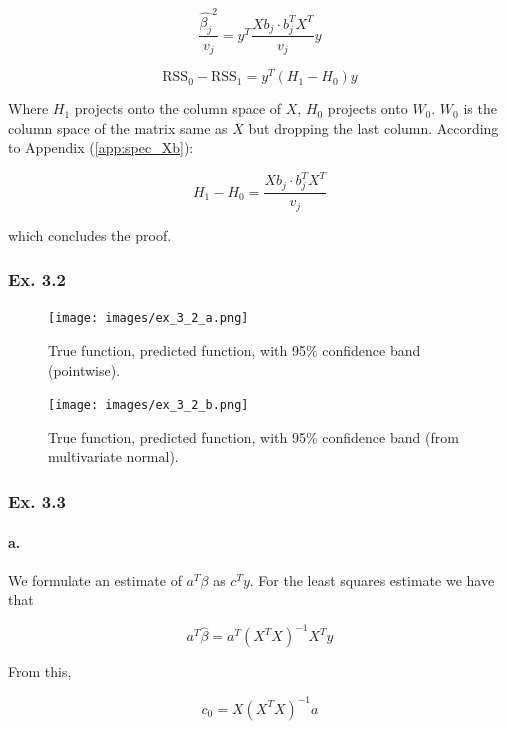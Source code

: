 \documentclass{article}
\begin{document}
\begin{equation}
    \frac{\hat{\beta_j}^2}{v_j} = y^T \frac{Xb_j \cdot b^T_j X^T}{v_j} y
\end{equation}

\begin{equation}
    \text{RSS}_0 - \text{RSS}_1 = y^T (H_1 - H_0) y
\end{equation}

Where $H_1$ projects onto the column space of $X$, $H_0$ projects onto $W_0$. $W_0$ is the column space of the matrix same as $X$ but dropping the last column. According to Appendix (\ref{app:spec_Xb}):

\begin{equation}
    H_1 - H_0 = \frac{Xb_j \cdot b^T_j X^T}{v_j}
\end{equation}

which concludes the proof.

\subsubsection{Ex. 3.2}

\begin{figure}[ht]
 \centering
  \texttt{[image: images/ex\_3\_2\_a.png]}
 \caption{True function, predicted function, with 95\% confidence band (pointwise).}
\end{figure}

\begin{figure}[ht]
 \centering
  \texttt{[image: images/ex\_3\_2\_b.png]}
 \caption{True function, predicted function, with 95\% confidence band (from multivariate normal).}
\end{figure}

\subsubsection{Ex. 3.3}

\paragraph{a.} We formulate an estimate of $a^T\beta$ as $c^Ty$. For the least squares estimate we have that

\begin{equation}
    a^T \hat{\beta} = a^T (X^TX)^{-1}X^T y
\end{equation}

From this,

\begin{equation}
    c_0 = X(X^TX)^{-1}a
\end{equation}
\end{document}
